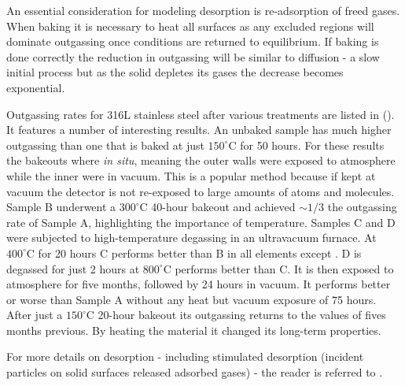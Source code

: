An essential consideration for modeling desorption is re-adsorption of freed gases.  When baking it is necessary to heat all surfaces as
any excluded regions will dominate outgassing once conditions are returned to equilibrium.  If baking is done correctly the reduction in
outgassing will be similar to diffusion - a slow initial process but as the solid depletes its gases the decrease becomes
exponential.

Outgassing rates for 316L stainless steel after various treatments are listed in
 ().  It features a number of interesting
results.  An unbaked sample has
much higher outgassing than one that is baked at just $150^{\circ}\mathrm{C}$ for 50 hours.  For these results the bakeouts where
\textit{in situ}, meaning the outer walls were exposed to atmosphere while the inner were in vacuum.  This is a popular method because
if kept at vacuum the detector is not re-exposed to large amounts of atoms and molecules.  Sample B underwent a $300^{\circ}\mathrm{C}$
40-hour bakeout and achieved ${\sim} 1/3$ the outgassing rate of Sample A, highlighting the importance of temperature.  Samples C and D
were subjected to high-temperature degassing in an ultravacuum furnace.  At $400^{\circ}\mathrm{C}$ for 20 hours C performs better than B
in all elements except .  D is degassed for just 2 hours at $800^{\circ}\mathrm{C}$ performs better than C.  It is then exposed
to atmosphere for five months, followed by 24 hours in vacuum.  It performs better or worse than Sample A without any heat but vacuum
exposure of 75 hours.  After just a $150^{\circ}\mathrm{C}$ 20-hour bakeout its outgassing returns to the values of fives months
previous.  By heating the material it changed its long-term properties.

For more details on desorption - including stimulated desorption (incident particles on solid surfaces released adsorbed gases) - the
reader is referred to .



